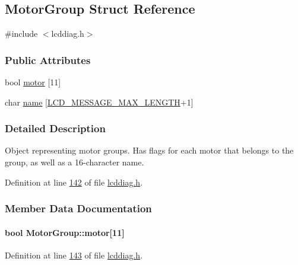 \hypertarget{struct_motor_group}{}\subsection{Motor\+Group Struct Reference}
\label{struct_motor_group}


{\ttfamily \#include $<$lcddiag.\+h$>$}

\subsubsection*{Public Attributes}
\begin{DoxyCompactItemize}
\item 
bool \hyperlink{struct_motor_group_a05d10a69eb1ae279fab13f9a009d84be}{motor} \mbox{[}11\mbox{]}
\item 
char \hyperlink{struct_motor_group_a8f7c6b03cfece909eb0db0b67ce24e6a}{name} \mbox{[}\hyperlink{lcdmsg_8h_abe4c4b70fc6f44ae3680e5b2c68cdd00}{L\+C\+D\+\_\+\+M\+E\+S\+S\+A\+G\+E\+\_\+\+M\+A\+X\+\_\+\+L\+E\+N\+G\+TH}+1\mbox{]}
\end{DoxyCompactItemize}


\subsubsection{Detailed Description}
Object representing motor groups. Has flags for each motor that belongs to the group, as well as a 16-\/character name. 

Definition at line \hyperlink{lcddiag_8h_source_l00142}{142} of file \hyperlink{lcddiag_8h_source}{lcddiag.\+h}.



\subsubsection{Member Data Documentation}
\paragraph[{\texorpdfstring{motor}{motor}}]{\setlength{\rightskip}{0pt plus 5cm}bool Motor\+Group\+::motor\mbox{[}11\mbox{]}}\hypertarget{struct_motor_group_a05d10a69eb1ae279fab13f9a009d84be}{}\label{struct_motor_group_a05d10a69eb1ae279fab13f9a009d84be}


Definition at line \hyperlink{lcddiag_8h_source_l00143}{143} of file \hyperlink{lcddiag_8h_source}{lcddiag.\+h}.

